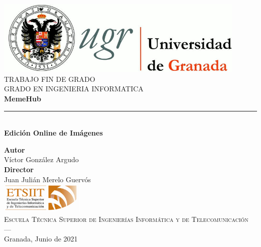 \begin{titlepage}
\newlength{\centeroffset}
\setlength{\centeroffset}{-0.5\oddsidemargin}
\addtolength{\centeroffset}{0.5\evensidemargin}
\thispagestyle{empty}

\noindent\hspace*{\centeroffset}\begin{minipage}{\textwidth}

\centering
\includegraphics[width=0.9\textwidth]{logos/logo_ugr.jpg}\\[1.4cm]

\textsc{ \Large TRABAJO FIN DE GRADO\\[0.2cm]}
\textsc{ GRADO EN INGENIERIA INFORMATICA}\\[1cm]

{\Huge\bfseries MemeHub \\}
\noindent\rule[-1ex]{\textwidth}{3pt}\\[3.5ex]
{\large\bfseries Edición Online de Imágenes }
\end{minipage}

\vspace{2.5cm}
\noindent\hspace*{\centeroffset}
\begin{minipage}{\textwidth}
\centering

\textbf{Autor}\\ {Víctor González Argudo}\\[2.5ex]
\textbf{Director}\\ {Juan Julián Merelo Guervós}\\[2cm]
\includegraphics[width=0.3\textwidth]{logos/etsiit_logo.png}\\[0.1cm]
\textsc{Escuela Técnica Superior de Ingenierías Informática y de Telecomunicación}\\
\textsc{---}\\
Granada, Junio de 2021
\end{minipage}
\end{titlepage}
